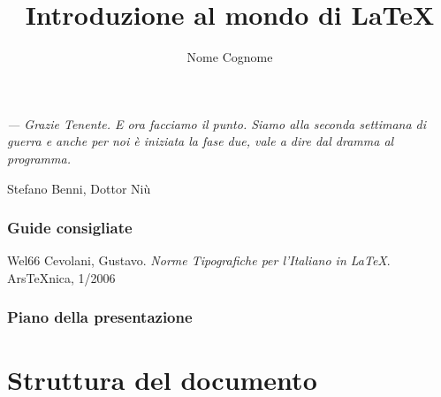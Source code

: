 \documentclass[svgnames,%
	ucs,%
	pdftex]{guitbeamer}
\title{Introduzione al mondo di \LaTeX}
\author[Nome Cognome]{Nome Cognome}
\date{} %
\begin{document}
\frame{\titlepage}
\begin{frame}
  \itshape
	--- Grazie Tenente. E ora facciamo il punto. Siamo alla
	seconda settimana di guerra e anche per noi \`e iniziata la fase
	due, vale a dire dal dramma al programma. 
	\begin{flushright}\upshape
		Stefano Benni, Dottor Ni\`u
	\end{flushright}
\end{frame}
\begin{frame}
  \frametitle{Guide consigliate}
	\begin{thebibliography}{Wel66}
			Cevolani, Gustavo.
			\newblock\textit{Norme Tipografiche per l'Italiano in \LaTeX}.
			\newblock  Ars\TeX nica, 1/2006
	\end{thebibliography}
\end{frame}
\begin{frame}
  \frametitle{Piano della presentazione}
  \tableofcontents
\end{frame}
\section{Struttura del documento}
\end{document}
